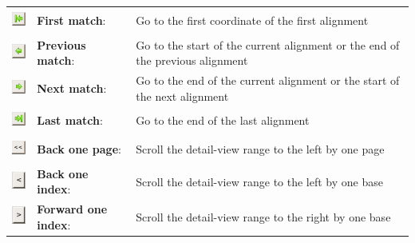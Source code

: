 \documentclass[letterpaper]{article}
\begin{document}
\begin{center}
\begin{supertabular}{b{1.5cm}p{4.373cm}p{8.967cm}}
\includegraphics[width=0.693cm,height=0.693cm]{img_button_first_match.png} &
\textbf{First match}: &
Go to the first coordinate of the first
alignment\footnotemark[1]\\
 
\includegraphics[width=0.693cm,height=0.693cm]{img_button_prev_match.png} &
\textbf{Previous match}: &
Go to the start of the current alignment or the
end of the previous alignment\footnotemark[1]\\
 
\includegraphics[width=0.693cm,height=0.693cm]{img_button_next_match.png} &
\textbf{Next match}: &
Go to the end of the current alignment or the
start of the next alignment\footnotemark[1]\\
 
\includegraphics[width=0.693cm,height=0.693cm]{img_button_last_match.png} &
\textbf{Last match}: &
Go to the end of the last
alignment\footnotemark[1]\\
 
\includegraphics[width=0.693cm,height=0.693cm]{img_button_back_page.png} &
\textbf{Back one page}: &
Scroll the detail-view range to the left by one
page\\
 
\includegraphics[width=0.536cm,height=0.7cm]{img_button_back_base.png} &
\textbf{Back one index}: &
Scroll the detail-view range to the left by one
base\\
 
\includegraphics[width=0.601cm,height=0.769cm]{img_button_forward_base.png} &
\textbf{Forward one index}: &
Scroll the detail-view range to the right by
one base\\
 

\end{supertabular}
\end{center}
\end{document}
